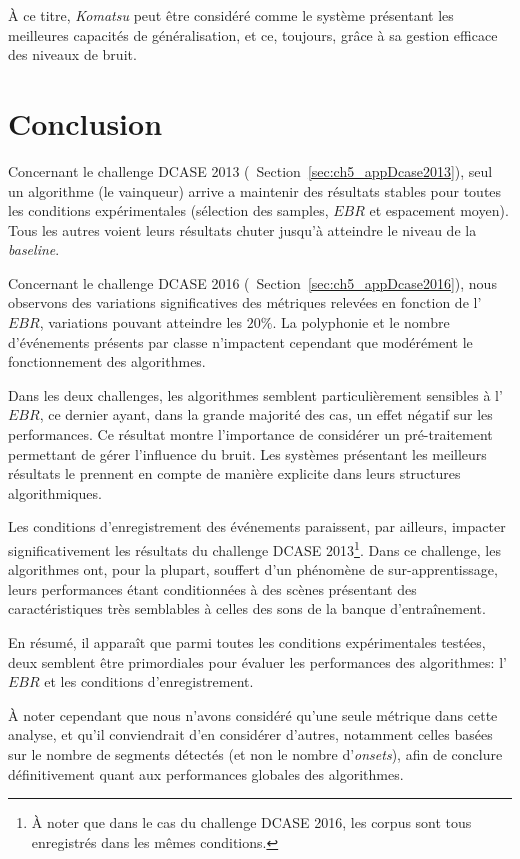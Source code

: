 À ce titre, \emph{Komatsu} peut être considéré comme le système présentant les meilleures capacités de généralisation, et ce, toujours, grâce à sa gestion efficace des niveaux de bruit.

\section{Conclusion}

Concernant le challenge DCASE 2013 (\cf~Section~\ref{sec:ch5_appDcase2013}), seul un algorithme (le vainqueur) arrive a maintenir des résultats stables pour toutes les conditions expérimentales (sélection des samples, $EBR$ et espacement moyen). Tous les autres voient leurs résultats chuter jusqu'à atteindre le niveau de la \emph{baseline}.

Concernant le challenge DCASE 2016 (\cf~Section~\ref{sec:ch5_appDcase2016}), nous observons des variations significatives des métriques relevées en fonction de l'$EBR$, variations pouvant atteindre les $20\%$. La polyphonie et le nombre d'événements présents par classe n'impactent cependant que modérément le fonctionnement des algorithmes.

Dans les deux challenges, les algorithmes semblent particulièrement sensibles à l'$EBR$, ce dernier ayant, dans la grande majorité des cas, un effet négatif sur les performances. Ce résultat montre l'importance de considérer un pré-traitement permettant de gérer l'influence du bruit. Les systèmes présentant les meilleurs résultats le prennent en compte de manière explicite dans leurs structures algorithmiques.

Les conditions d'enregistrement des événements paraissent, par ailleurs, impacter significativement les résultats du challenge DCASE 2013\footnote{À noter que dans le cas du challenge DCASE 2016, les corpus sont tous enregistrés dans les mêmes conditions.}. Dans ce challenge, les algorithmes ont, pour la plupart, souffert d'un phénomène de sur-apprentissage, leurs performances étant conditionnées à des scènes présentant des caractéristiques très semblables à celles des sons de la banque d’entraînement.

En résumé, il apparaît que parmi toutes les conditions expérimentales testées, deux semblent être primordiales pour évaluer les performances des algorithmes: l'$EBR$ et les conditions d'enregistrement.

À noter cependant que nous n'avons considéré qu'une seule métrique dans cette analyse, et qu'il conviendrait d'en considérer d'autres, notamment celles basées sur le nombre de segments détectés (et non le nombre d'\emph{onsets}), afin de conclure définitivement quant aux performances globales des algorithmes.

